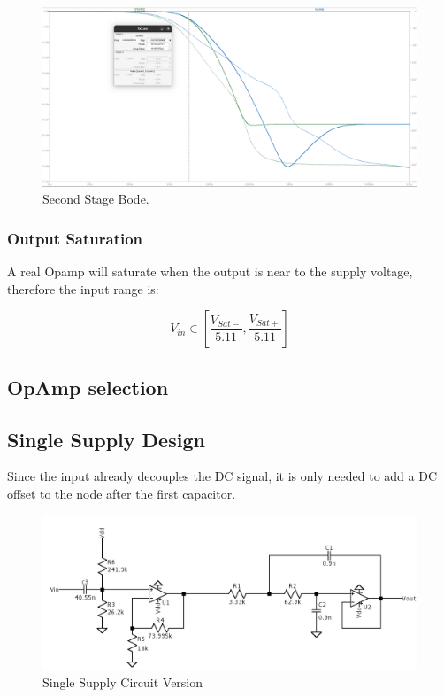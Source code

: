 \begin{figure}[H]
    \centering
    \includegraphics*[scale = 0.25]{Images/P2BodeGBWStg2.png}
    \caption{Second Stage Bode.}
\end{figure}

\subsubsection{Output Saturation}

A real Opamp will saturate when the output is near to the supply voltage, therefore the input range is:

\begin{equation}
   V_{in} \in \left [ \frac{V_{Sat-}}{5.11} , \frac{V_{Sat+}}{5.11} \right ]
\end{equation}

\subsection{OpAmp selection}

\subsection{Single Supply Design}

Since the input already decouples the DC signal, it is only needed to add a DC offset to the node after the first capacitor.

\begin{figure}[H]
    \centering
    \includegraphics*[scale = 0.25]{Images/P2CircSingSup.png}
    \caption{Single Supply Circuit Version}
\end{figure}

